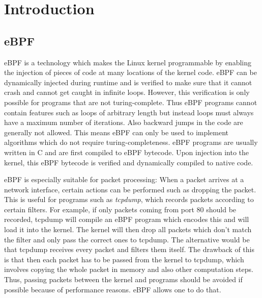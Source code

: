 \documentclass[conference]{IEEEtran}
\begin{document}

\maketitle

\section{Introduction}

\subsection{eBPF}

eBPF is a technology which makes the Linux kernel programmable by enabling the injection of pieces of code at many locations of the kernel code. eBPF can be dynamically injected during runtime and is verified to make sure that it cannot crash and cannot get caught in infinite loops. However, this verification is only possible for programs that are not turing-complete. Thus eBPF programs cannot contain features such as loops of arbitrary length but instead loops must always have a maximum number of iterations. Also backward jumps in the code are generally not allowed. This means eBPF can only be used to implement algorithms which do not require turing-completeness. eBPF programs are usually written in C and are first compiled to eBPF bytecode. Upon injection into the kernel, this eBPF bytecode is verified and dynamically compiled to native code. 

eBPF is especially suitable for packet processing: When a packet arrives at a network interface, certain actions can be performed such as dropping the packet. This is useful for programs such as \textit{tcpdump}, which records packets according to certain filters. For example, if only packets coming from port 80 should be recorded, tcpdump will compile an eBPF program which encodes this and will load it into the kernel. The kernel will then drop all packets which don't match the filter and only pass the correct ones to tcpdump. The alternative would be that tcpdump receives every packet and filters them itself. The drawback of this is that then each packet has to be passed from the kernel to tcpdump, which involves copying the whole packet in memory and also other computation steps. Thus, passing packets between the kernel and programs should be avoided if possible because of performance reasons. eBPF allows one to do that. 
\end{document}
